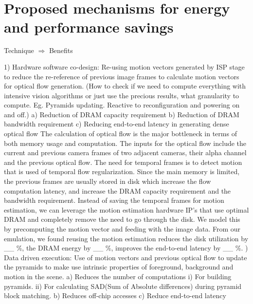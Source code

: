 \chapter{Proposed mechanisms for energy and performance savings}

	Technique $\Rightarrow$ Benefits  \newline

1) Hardware software co-design: Re-using motion vectors generated by ISP stage to reduce the re-reference of previous image frames to calculate motion vectors for optical flow generation.\newline
(How to check if we need to compute everything with intensive vision algorithms or just use the precious results, what granularity to compute. Eg. Pyramids updating. Reactive to reconfiguration and powering on and off.)\newline
	a) Reduction of DRAM capacity requirement\newline
	b) Reduction of DRAM bandwidth requirement\newline
	c) Reducing end-to-end latency in generating dense optical flow \newline
The calculation of optical flow is the major bottleneck in terms of both memory usage and computation. The inputs for the optical flow include the current and previous camera frames of two adjacent cameras, their alpha channel and the previous optical flow. The need for temporal frames is to detect motion that is used of temporal flow regularization. Since the main memory is limited, the previous frames are usually stored in disk which increase the flow computation latency, and increase the DRAM capacity requirement and the bandwidth requirement. Instead of saving the temporal frames  for motion estimation, we can leverage the motion estimation hardware IP's that use optimal DRAM and completely remove the need to go through the disk. We model this by precomputing the motion vector and feeding with the image data. From our emulation, we found reusing the motion estimation reduces the disk utilization by \_\_ \%, the DRAM energy by \_\_ \%, improves the end-to-end latency by \_\_ \%. 
) Data driven execution: Use of motion vectors and previous optical flow to update the pyramids to make use intrinsic properties of foreground, background and motion in the scene.
	a) Reduces the number of computations 
		i) For building pyramids.
		ii) For calculating SAD(Sum of Absolute differences) during pyramid block matching.
	b) Reduces off-chip accesses
	c) Reduce end-to-end latency
\newline

